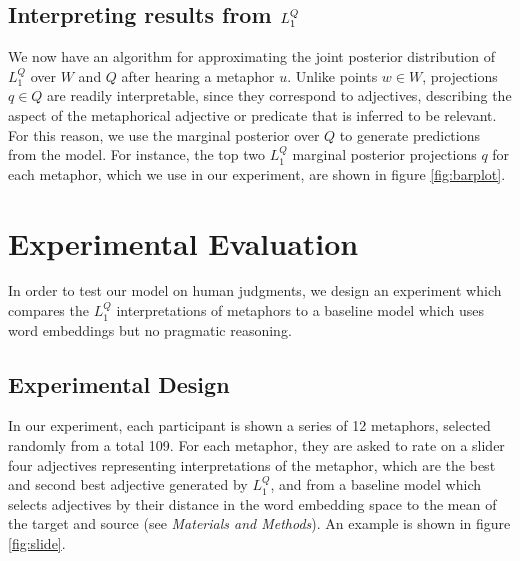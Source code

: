 \documentclass[9pt,twocolumn,twoside,lineno]{pnas-new}
\newcommand{\Listener}{L}
\newcommand{\QLONE}{\Listener_{{1}}^{{Q}}}
\begin{document}
\subsection{Interpreting results from $\protect\QLONE$}

	We now have an algorithm for approximating the joint posterior distribution of $\QLONE$ over $W$ and $Q$ after hearing a metaphor $u$. Unlike points $w\in W$, projections $q\in Q$ are readily interpretable, since they correspond to adjectives, describing the aspect of the metaphorical adjective or predicate that is inferred to be relevant.
	For this reason, we use the marginal posterior over $Q$ to generate predictions from the model. For instance, the top two $\QLONE$ marginal posterior projections $q$ for each metaphor, which we use in our experiment, are shown in figure \ref{fig:barplot}. 





\section{Experimental Evaluation} \label{exp}

	In order to test our model on human judgments, we design an experiment which compares the $\QLONE$ interpretations of metaphors to a baseline model which uses word embeddings but no pragmatic reasoning.


	\subsection*{Experimental Design}

		In our experiment, each participant is shown a series of 12 metaphors, selected randomly from a total 109. For each metaphor, they are asked to rate on a slider four adjectives representing interpretations of the metaphor, which are the best and second best adjective generated by $\QLONE$, and from a baseline model which selects adjectives by their distance in the word embedding space to the mean of the target and source (see \emph{Materials and Methods}). An example is shown in figure \ref{fig:slide}.
\end{document}
